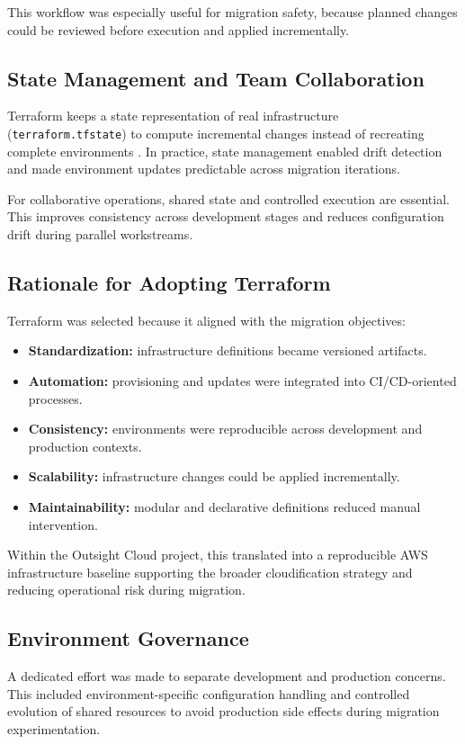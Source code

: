 This workflow was especially useful for migration safety, because planned changes could be reviewed before execution and applied incrementally.

\subsection{State Management and Team Collaboration}
Terraform keeps a state representation of real infrastructure (\texttt{terraform.tfstate}) to compute incremental changes instead of recreating complete environments \cite{hashicorpTerraformIntro}. In practice, state management enabled drift detection and made environment updates predictable across migration iterations.

For collaborative operations, shared state and controlled execution are essential. This improves consistency across development stages and reduces configuration drift during parallel workstreams.

\subsection{Rationale for Adopting Terraform}
Terraform was selected because it aligned with the migration objectives:
\begin{itemize}
    \item \textbf{Standardization:} infrastructure definitions became versioned artifacts.
    \item \textbf{Automation:} provisioning and updates were integrated into CI/CD-oriented processes.
    \item \textbf{Consistency:} environments were reproducible across development and production contexts.
    \item \textbf{Scalability:} infrastructure changes could be applied incrementally.
    \item \textbf{Maintainability:} modular and declarative definitions reduced manual intervention.
\end{itemize}

Within the Outsight Cloud project, this translated into a reproducible AWS infrastructure baseline supporting the broader cloudification strategy and reducing operational risk during migration.

\subsection{Environment Governance}
A dedicated effort was made to separate development and production concerns. This included environment-specific configuration handling and controlled evolution of shared resources to avoid production side effects during migration experimentation.

